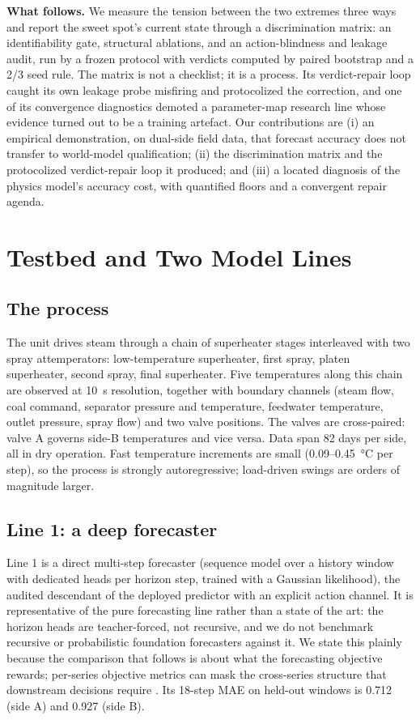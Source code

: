 \documentclass{article}
\begin{document}
\textbf{What follows.} We measure the tension between the two extremes three ways and
report the sweet spot's current state through a discrimination matrix: an
identifiability gate, structural ablations, and
an action-blindness and leakage audit, run by a frozen protocol with verdicts
computed by paired bootstrap and a 2/3 seed rule. The matrix is not a checklist; it
is a process. Its verdict-repair loop caught its own leakage probe misfiring and
protocolized the correction, and one of its convergence diagnostics demoted a
parameter-map research line whose evidence turned out to be a training artefact. Our
contributions are (i) an empirical demonstration, on dual-side field data, that
forecast accuracy does not transfer to world-model qualification; (ii) the
discrimination matrix and the protocolized verdict-repair loop it produced; and (iii)
a located diagnosis of the physics model's accuracy cost, with quantified floors and
a convergent repair agenda.

\section{Testbed and Two Model Lines}

\subsection{The process}

The unit drives steam through a chain of superheater stages interleaved with two
spray attemperators: low-temperature superheater, first spray, platen superheater,
second spray, final superheater. Five temperatures along this chain are observed at
10~s resolution, together with boundary channels (steam flow, coal command, separator
pressure and temperature, feedwater temperature, outlet pressure, spray flow) and two
valve positions. The valves are cross-paired: valve A governs side-B temperatures and
vice versa. Data span 82 days per side, all in dry operation. Fast temperature
increments are small (0.09--0.45~\si{\degreeCelsius} per step), so the process is
strongly autoregressive; load-driven swings are orders of magnitude larger.

\subsection{Line 1: a deep forecaster}

Line 1 is a direct multi-step forecaster (sequence model over a history window with
dedicated heads per horizon step, trained with a Gaussian likelihood), the audited
descendant of the deployed predictor with an explicit action channel. It is
representative of the pure forecasting line rather than a state of the art: the
horizon heads are teacher-forced, not recursive, and we do not benchmark recursive
or probabilistic foundation forecasters \cite{ansari2024chronos, das2024timesfm}
against it. We state this plainly because the
comparison that follows is about what the forecasting objective rewards; per-series
objective metrics can mask the cross-series structure that downstream decisions
require \cite{wan2026forecast}. Its 18-step MAE on held-out windows is 0.712 (side A)
and 0.927 (side B).
\end{document}
